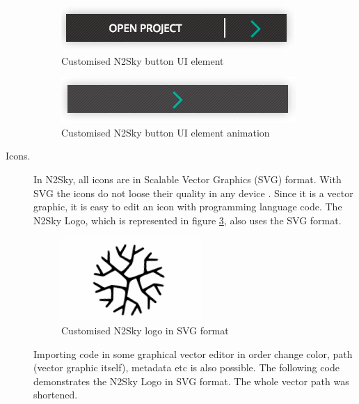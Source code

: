 \begin{description}
\begin{figure}[htbp]
\begin{center}
  \includegraphics[scale=0.55]{components/3/components/button_inactive.png}
  \caption{Customised N2Sky button UI element}
  \label{fig:button_inactive}
\end{center}
\end{figure}


\begin{figure}[htbp]
\begin{center}
  \includegraphics[scale=0.55]{components/3/components/button_active.png}
  \caption{Customised N2Sky button UI element animation}
  \label{fig:button_active}
\end{center}
\end{figure}

\item[Icons.] In N2Sky, all icons are in Scalable Vector Graphics (SVG) format. With SVG the icons do not loose their quality in any device \cite{Cagle2005}. Since it is a vector graphic, it is easy to edit an icon with programming language code. The N2Sky Logo, which is represented in figure \ref{fig:logo}, also uses the SVG format. 

\begin{figure}[htbp]
\begin{center}
  \includegraphics[scale=0.55]{components/3/components/logo.png}
  \caption{Customised N2Sky logo in SVG format}
  \label{fig:logo}
\end{center}
\end{figure}

Importing code in some graphical vector editor in order change color, path (vector graphic itself), metadata etc is also possible. The following code demonstrates the N2Sky Logo in SVG format. The whole vector path was shortened.


\end{description}
